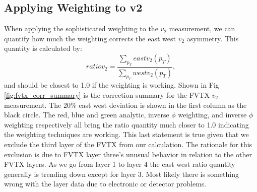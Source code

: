 \subsection{Applying Weighting to v2}
When applying the sophisticated weighting to the $v_2$ measurement, we can quantify how much the weighting corrects the east west $v_2$ asymmetry. This quantity is calculated by: 
\begin{equation}
ratio v_2 = \frac{\sum_{p_T}{eastv_2(p_T)}}{\sum_{p_T}{westv_2(p_T)}},
\end{equation}
and should be closest to 1.0 if the weighting is working.
Shown in Fig \ref{fig:fvtx_corr_summary} is the correction summary for the FVTX $v_2$ measurement. The 20\% east west deviation is shown in the first column as the black circle. The red, blue and green analytic, inverse $\phi$ weighting, and inverse $\phi$ weighting respectively all bring the ratio quantity much closer to 1.0 indicating the weighting techniques are working. This last statement is true given that we exclude the third layer of the FVTX from our calculation. The rationale for this exclusion is due to FVTX layer three's unusual behavior in relation to the other FVTX layers. As we go from layer 1 to layer 4 the east west ratio quantity generally is trending down except for layer 3. Most likely there is something wrong with the layer data due to electronic or detector problems. 

